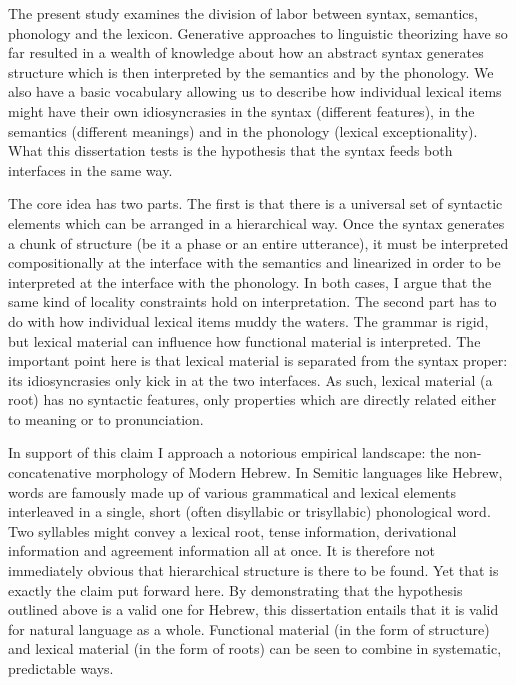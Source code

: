 The present study examines the division of labor between syntax, semantics, phonology and the lexicon. Generative approaches to linguistic theorizing have so far resulted in a wealth of knowledge about how an abstract syntax generates structure which is then interpreted by the semantics and by the phonology. We also have a basic vocabulary allowing us to describe how individual lexical items might have their own idiosyncrasies in the syntax (different features), in the semantics (different meanings) and in the phonology (lexical exceptionality). What this dissertation tests is the hypothesis that the syntax feeds both interfaces in the same way.

The core idea has two parts. The first is that there is a universal set of syntactic elements which can be arranged in a hierarchical way. Once the syntax generates a chunk of structure (be it a phase or an entire utterance), it must be interpreted compositionally at the interface with the semantics and linearized in order to be interpreted at the interface with the phonology. In both cases, I argue that the same kind of locality constraints hold on interpretation. The second part has to do with how individual lexical items muddy the waters. The grammar is rigid, but lexical material can influence how functional material is interpreted. The important point here is that lexical material is separated from the syntax proper: its idiosyncrasies only kick in at the two interfaces. As such, lexical material (a root) has no syntactic features, only properties which are directly related either to meaning or to pronunciation.

In support of this claim I approach a notorious empirical landscape: the non-concatenative morphology of Modern Hebrew. In Semitic languages like Hebrew, words are famously made up of various grammatical and lexical elements interleaved in a single, short (often disyllabic or trisyllabic) phonological word. Two syllables might convey a lexical root, tense information, derivational information and agreement information all at once. It is therefore not immediately obvious that hierarchical structure is there to be found. Yet that is exactly the claim put forward here. By demonstrating that the hypothesis outlined above is a valid one for Hebrew, this dissertation entails that it is valid for natural language as a whole. Functional material (in the form of structure) and lexical material (in the form of roots) can be seen to combine in systematic, predictable ways.

